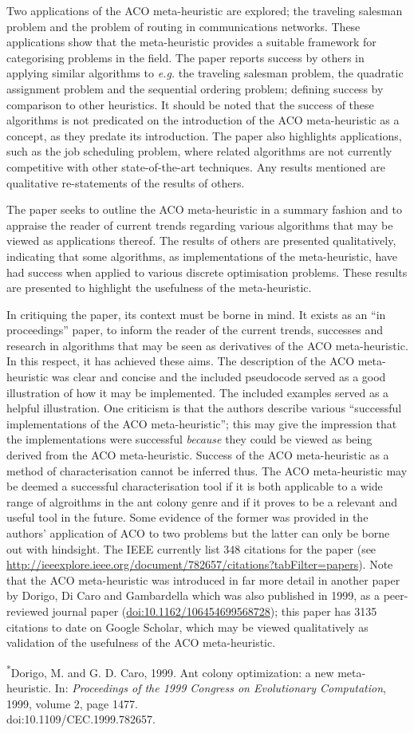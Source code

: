 \documentclass[a4paper,10pt]{report}
\begin{document}
Two applications of the ACO meta-heuristic are explored; the traveling salesman problem and the problem of routing in communications networks.  These applications show that the meta-heuristic provides a suitable framework for categorising problems in the field.  The paper reports success by others in applying similar algorithms to \emph{e.g.} the traveling salesman problem, the quadratic assignment problem and the sequential ordering problem; defining success by comparison to other heuristics.  It should be noted that the success of these algorithms is not predicated on the introduction of the ACO meta-heuristic as a concept, as they predate its introduction.  The paper also highlights applications, such as the job scheduling problem, where related algorithms are not currently competitive with other state-of-the-art techniques. Any results mentioned are qualitative re-statements of the results of others.

The paper seeks to outline the ACO meta-heuristic in a summary fashion and to appraise the reader of current trends regarding various algorithms that may be viewed as applications thereof. The results of others are presented qualitatively, indicating that some algorithms, as implementations of the meta-heuristic, have had success when applied to various discrete optimisation problems.  These results are presented to highlight the usefulness of the meta-heuristic.  

In critiquing the paper, its context must be borne in mind.  It exists as an ``in proceedings'' paper, to inform the reader of the current trends, successes and research in algorithms that may be seen as derivatives of the ACO meta-heuristic.  In this respect, it has achieved these aims. The description of the ACO meta-heuristic was clear and concise and the included pseudocode served as a good illustration of how it may be implemented. The included examples served as a helpful illustration. One criticism is that the authors describe various ``successful implementations of the ACO meta-heuristic''; this may give the impression that the implementations were successful \emph{because} they could be viewed as being derived from the ACO meta-heuristic. Success of the ACO meta-heuristic as a method of characterisation cannot be inferred thus. The ACO meta-heuristic may be deemed a successful characterisation tool if it is both applicable to a wide range of algroithms in the ant colony genre and if it proves to be a relevant and useful tool in the future.  Some evidence of the former was provided in the authors' application of ACO to two problems but the latter can only be borne out with hindsight.  The IEEE currently list 348 citations for the paper (see \url{http://ieeexplore.ieee.org/document/782657/citations?tabFilter=papers}).  Note that the ACO meta-heuristic was introduced in far more detail in another paper by Dorigo, Di Caro and Gambardella which was also published in 1999, as a peer-reviewed journal paper (\href{https://doi.org/10.1162/106454699568728}{doi:10.1162/106454699568728}); this paper has 3135 citations to date on Google Scholar, which may be viewed qualitatively as validation of the usefulness of the ACO meta-heuristic.
	
\vspace{0.25in}
\noindent
\textsuperscript{*}Dorigo, M. and G. D. Caro, 1999. Ant colony optimization: a new meta-heuristic. In: \emph{Proceedings of the 1999 Congress on Evolutionary Computation}, 1999, volume 2, page 1477. \\doi:10.1109/CEC.1999.782657.
\end{document}
